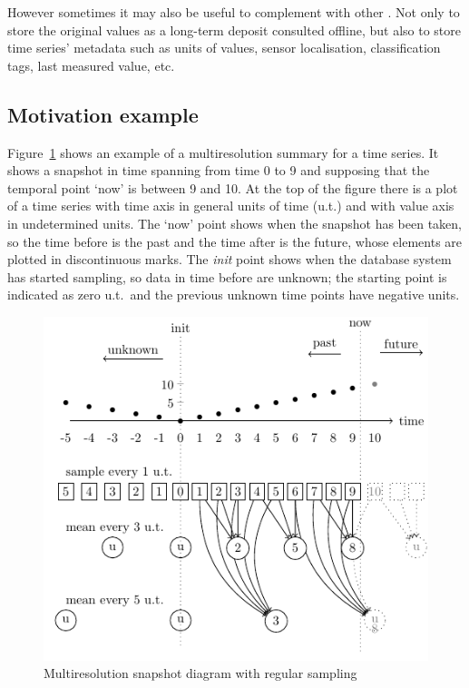 However sometimes it may also be useful to complement 
with other . Not only to store the original values as a
long-term deposit consulted offline, but also to store time series'
metadata such as units of values, sensor localisation, classification
tags, last measured value, etc.



\subsection{Motivation example}

Figure~\ref{fig:mtsms:sequence} shows an example of a multiresolution
summary for a time series.  It shows a snapshot in time spanning from
time 0 to 9 and supposing that the temporal point `now' is between 9
and 10. At the top of the figure there is a plot of a time series with
time axis in general units of time (u.t.) and with value axis in
undetermined units. The `now' point shows when the snapshot has been
taken, so the time before is the past and the time after is the
future, whose elements are plotted in discontinuous marks. The
\emph{init} point shows when the database system has started sampling,
so data in time before are unknown; the starting point is indicated as
zero u.t.\ and the previous unknown time points have negative units.


\begin{figure}
  \centering
  \includegraphics{fig_mtsms_sequence.pdf}
  \caption{Multiresolution snapshot diagram with regular sampling}
  \label{fig:mtsms:sequence}
\end{figure}


